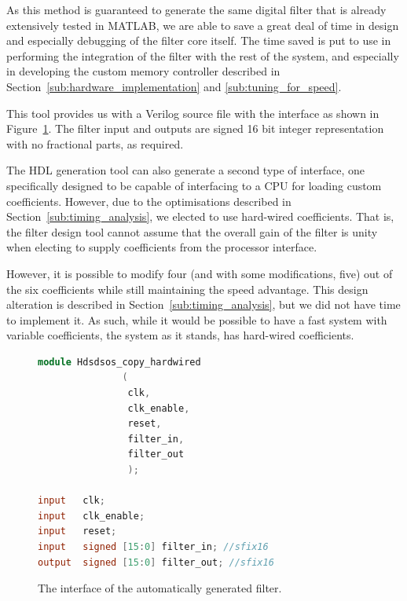 \documentclass[]{article}
\begin{document}
As this method is guaranteed to generate the same digital filter that is already extensively tested in MATLAB, we are able to save a great deal of time in design and especially debugging of the filter core itself.
The time saved is put to use in performing the integration of the filter with the rest of the system, and especially in developing the custom memory controller described in Section~\ref{sub:hardware_implementation} and \ref{sub:tuning_for_speed}.

This tool provides us with a Verilog source file with the interface as shown in Figure~\ref{fig:Hdsdsos_interface}. The filter input and outputs are signed 16 bit integer representation with no fractional parts, as required.

The HDL generation tool can also generate a second type of interface, one specifically designed to be capable of interfacing to a CPU for loading custom coefficients. However, due to the optimisations described in Section~\ref{sub:timing_analysis}, we elected to use hard-wired coefficients.
That is, the filter design tool cannot assume that the overall gain of the filter is unity when electing to supply coefficients from the processor interface.

However, it is possible to modify four (and with some modifications, five) out of the six coefficients while still maintaining the speed advantage. This design alteration is described in Section~\ref{sub:timing_analysis}, but we did not have time to implement it.
As such, while it would be possible to have a fast system with variable coefficients, the system as it stands, has hard-wired coefficients.

\begin{figure}[bt]
	\begin{center}
		\begin{lstlisting}[language = Verilog]
module Hdsdsos_copy_hardwired
               (
                clk,
                clk_enable,
                reset,
                filter_in,
                filter_out
                );

input   clk; 
input   clk_enable; 
input   reset; 
input   signed [15:0] filter_in; //sfix16
output  signed [15:0] filter_out; //sfix16
		\end{lstlisting}
	\end{center}
	\caption{The interface of the automatically generated filter.}
	\label{fig:Hdsdsos_interface}
\end{figure}

\end{document}
